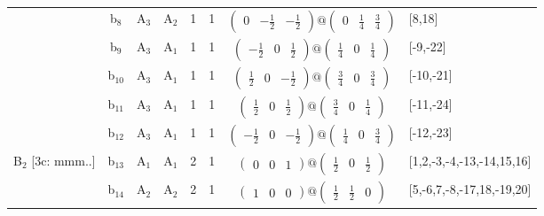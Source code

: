 \documentclass[fleqn,10pt,landscape]{article}
\begin{document}
\begin{itemize}
\begin{center}
\begin{longtable}{cc|cc|c|c|c|l}
& b$_{8}$ & A$_{3}$ & A$_{2}$ & 1 & 1 & $\begin{pmatrix} 0 & - \frac{1}{2} & - \frac{1}{2} \end{pmatrix}@\begin{pmatrix} 0 & \frac{1}{4} & \frac{3}{4} \end{pmatrix}$ & [8,18] \\
& b$_{9}$ & A$_{3}$ & A$_{1}$ & 1 & 1 & $\begin{pmatrix} - \frac{1}{2} & 0 & \frac{1}{2} \end{pmatrix}@\begin{pmatrix} \frac{1}{4} & 0 & \frac{1}{4} \end{pmatrix}$ & [-9,-22] \\
& b$_{10}$ & A$_{3}$ & A$_{1}$ & 1 & 1 & $\begin{pmatrix} \frac{1}{2} & 0 & - \frac{1}{2} \end{pmatrix}@\begin{pmatrix} \frac{3}{4} & 0 & \frac{3}{4} \end{pmatrix}$ & [-10,-21] \\
& b$_{11}$ & A$_{3}$ & A$_{1}$ & 1 & 1 & $\begin{pmatrix} \frac{1}{2} & 0 & \frac{1}{2} \end{pmatrix}@\begin{pmatrix} \frac{3}{4} & 0 & \frac{1}{4} \end{pmatrix}$ & [-11,-24] \\
& b$_{12}$ & A$_{3}$ & A$_{1}$ & 1 & 1 & $\begin{pmatrix} - \frac{1}{2} & 0 & - \frac{1}{2} \end{pmatrix}@\begin{pmatrix} \frac{1}{4} & 0 & \frac{3}{4} \end{pmatrix}$ & [-12,-23] \\ \hline
B$_{2}$ [3c: mmm..] & b$_{13}$ & A$_{1}$ & A$_{1}$ & 2 & 1 & $\begin{pmatrix} 0 & 0 & 1 \end{pmatrix}@\begin{pmatrix} \frac{1}{2} & 0 & \frac{1}{2} \end{pmatrix}$ & [1,2,-3,-4,-13,-14,15,16] \\
& b$_{14}$ & A$_{2}$ & A$_{2}$ & 2 & 1 & $\begin{pmatrix} 1 & 0 & 0 \end{pmatrix}@\begin{pmatrix} \frac{1}{2} & \frac{1}{2} & 0 \end{pmatrix}$ & [5,-6,7,-8,-17,18,-19,20] \\

\end{longtable}
\end{center}
\end{itemize}
\end{document}

